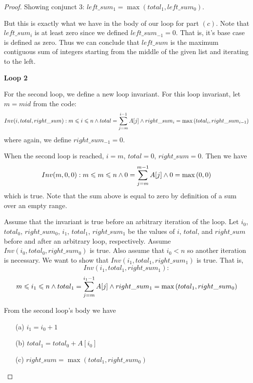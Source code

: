 \begin{proof}
    Showing conjunct 3: $left\_sum_1 = \max{(total_1, left\_sum_0)}$.
    
    But this is exactly what we have in the body of our loop for 
    part $(c)$. Note that $left\_sum_i$ is at least zero since we defined
    $left\_sum_{-1} = 0$. That is, it's base case is defined as zero.
    Thus we can conclude that $left\_sum$ is the maximum contiguous 
    sum of integers starting from the middle of the given list and 
    iterating to the left.
    
    \vspace{10mm}
    
    \textbf{Loop 2}
    
    For the second loop, we define a new loop invariant. For this
    loop invariant, let $m = mid$ from the code:
    $$Inv(i, total, right\_sum): m \leqslant i \leqslant n 
    \wedge total = \sum_{j = m}^{i - 1}A[j]
    \wedge right\_sum_i = \max{(total_i, right\_sum_{i-1})}$$
    where again, we define $right\_sum_{-1} = 0$.
    
    \base
    
    When the second loop is reached, $i = m$, $total = 0$, 
    $right\_sum = 0$. Then we have
    \[
    Inv(m, 0, 0): m \leqslant m \leqslant n
    \wedge 0 = \sum_{j = m}^{m - 1}A[j]
    \wedge 0 = \max{(0, 0)}
    \]
    which is true.
    Note that the sum above is equal to zero by definition of a sum 
    over an empty range.
    
    \istep
    
    Assume that the invariant is true before an arbitrary iteration
    of the loop. Let $i_0$, $total_0$, $right\_sum_0$, 
    $i_1$, $total_1$, $right\_sum_1$ be the values of 
    $i$, $total$, and $right\_sum$ before and after an arbitrary loop, 
    respectively.
    Assume
    $Inv(i_0, total_0, right\_sum_0)$ is true. Also assume
    that $i_0 < n$ so another iteration is necessary.
    We want to show that $Inv(i_1, total_1, right\_sum_1)$ is true. That is,
    \[
    Inv(i_1, total_1, right\_sum_1):
    \]
    \[
    m \leqslant i_1 \leqslant n 
    \wedge total_1 = \sum_{j = m}^{i_1 - 1}A[j]
    \wedge right\_sum_1 = \max{(total_1, right\_sum_{0})}
    \]
    
    From the second loop's body we have
    \begin{enumerate}
        \item [(a)] $i_1 = i_0 + 1$
        \item [(b)] $total_1 = total_0 + A[i_0]$
        \item [(c)] $right\_sum = \max{(total_1, right\_sum_0)}$
    \end{enumerate}
    

\end{proof}
